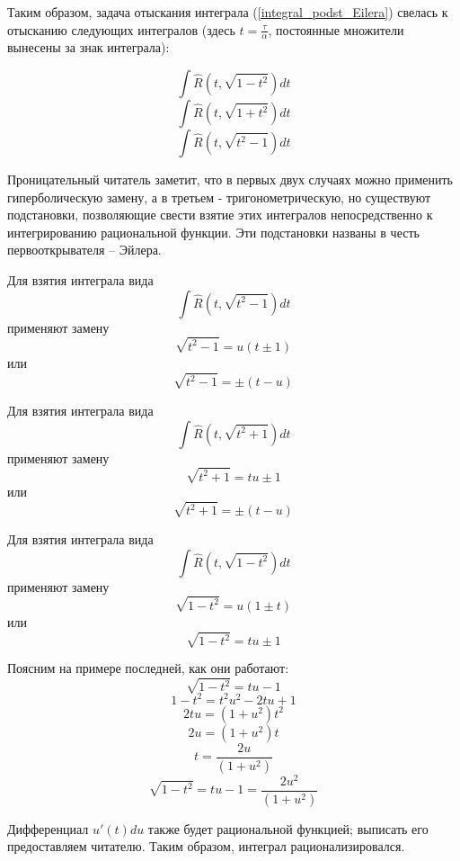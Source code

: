 Таким образом, задача отыскания интеграла (\ref{integral_podst_Eilera}) свелась к отысканию следующих интегралов (здесь $t=\frac{\tau}{\alpha}$, постоянные множители вынесены за знак интеграла):

$$
\int\hat R(t,\sqrt{1-t^2})dt
$$$$
\int\hat R(t,\sqrt{1+t^2})dt
$$$$
\int\hat R(t,\sqrt{t^2-1})dt
$$

Проницательный читатель заметит, что в первых двух случаях можно применить гиперболическую замену, а в третьем - тригонометрическую, но существуют подстановки, позволяющие свести взятие этих интегралов непосредственно к интегрированию рациональной функции. Эти подстановки названы в честь первооткрывателя -- Эйлера.

Для взятия интеграла вида
$$\int\hat R(t,\sqrt{t^2-1})dt$$
применяют замену
$$\sqrt{t^2-1}=u(t\pm 1)$$
или
$$\sqrt{t^2-1}=\pm(t-u)$$

Для взятия интеграла вида
$$\int\hat R(t,\sqrt{t^2+1})dt$$
применяют замену
$$\sqrt{t^2+1}=tu\pm 1$$
или
$$\sqrt{t^2+1}=\pm(t-u)$$

Для взятия интеграла вида
$$\int\hat R(t,\sqrt{1-t^2})dt$$
применяют замену
$$\sqrt{1-t^2}=u(1\pm t)$$
или
$$\sqrt{1-t^2}=tu\pm1$$

Поясним на примере последней, как они работают:
$$\sqrt{1-t^2}=tu-1$$
$$1-t^2=t^2 u^2 -2tu+1$$
$$2tu=(1+u^2)t^2$$
$$2u=(1+u^2)t$$
$$t=\frac{2u}{(1+u^2)}$$
$$\sqrt{1-t^2}=tu-1=\frac{2u^2}{(1+u^2)}$$

Дифференциал $u'(t)du$ также будет рациональной функцией; выписать его предоставляем читателю. Таким образом, интеграл рационализировался.

